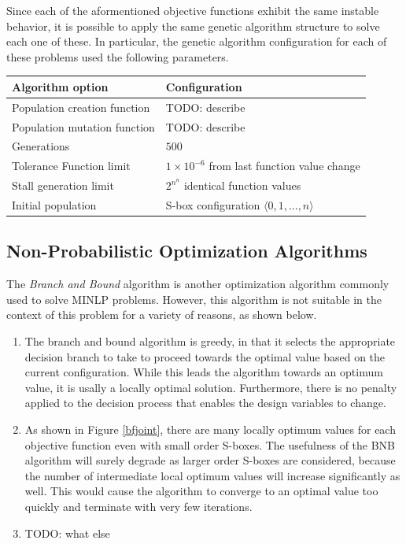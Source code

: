 \documentclass[11pt]{article}
\begin{document}
Since each of the aformentioned objective functions exhibit the same instable behavior, it is possible to apply the same genetic algorithm structure to solve each one of these. In particular, the genetic algorithm configuration for each of these problems used the following parameters.

\begin{table}
    \begin{tabular}{|l|l|}
        \hline
        \textbf{Algorithm option} & \textbf{Configuration} \\ \hline
        Population creation function & TODO: describe \\ 
        Population mutation function & TODO: describe \\ 
        Generations & $500$ \\ 
        Tolerance Function limit & $1 \times 10^{-6}$ from last function value change \\ 
        Stall generation limit & $2^{n^n}$ identical function values \\ 
        Initial population & S-box configuration $\langle 0, 1, ..., n \rangle$ \\
        \hline
    \end{tabular}
\end{table}

\subsection{Non-Probabilistic Optimization Algorithms}

The \emph{Branch and Bound} algorithm is another optimization algorithm commonly used to solve MINLP problems. However, this algorithm is not suitable in the context of this problem for a variety of reasons, as shown below.

\begin{enumerate}
	\item The branch and bound algorithm is greedy, in that it selects the appropriate decision branch to take to proceed towards the optimal value based on the current configuration. While this leads the algorithm towards an optimum value, it is usally a locally optimal solution. Furthermore, there is no penalty applied to the decision process that enables the design variables to change. 
	\item As shown in Figure \ref{bfjoint}, there are many locally optimum values for each objective function even with small order S-boxes. The usefulness of the BNB algorithm will surely degrade as larger order S-boxes are considered, because the number of intermediate local optimum values will increase significantly as well. This would cause the algorithm to converge to an optimal value too quickly and terminate with very few iterations. 
	\item TODO: what else
\end{enumerate}
\end{document}
